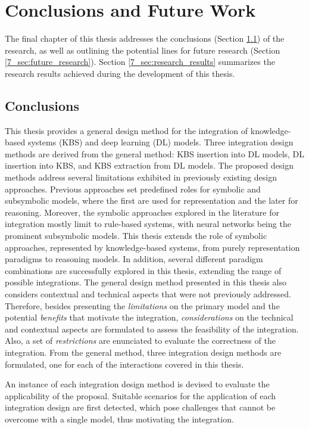 \chapter{Conclusions and Future Work}
\label{chap:conc}
The final chapter of this thesis addresses the conclusions (Section \ref{7_sec:conclusions}) of the research, as well as outlining the potential lines for future research (Section \ref{7_sec:future_research}). Section \ref{7_sec:research_results} summarizes the research results achieved during the development of this thesis.

\section{Conclusions}\label{7_sec:conclusions}
This thesis provides a general design method for the integration of knowledge-based systems (KBS) and deep learning (DL) models. Three integration design methods are derived from the general method: KBS insertion into DL models, DL insertion into KBS, and KBS extraction from DL models. The proposed design methods address several limitations exhibited in previously existing design approaches. Previous approaches set predefined roles for symbolic and subsymbolic models, where the first are used for representation and the later for reasoning. Moreover, the symbolic approaches explored in the literature for integration mostly limit to rule-based systems, with neural networks being the prominent subsymbolic models. This thesis extends the role of symbolic approaches, represented by knowledge-based systems, from purely representation paradigms to reasoning models. In addition, several different paradigm combinations are successfully explored in this thesis, extending the range of possible integrations. The general design method presented in this thesis also considers contextual and technical aspects that were not previously addressed. Therefore, besides presenting the \textit{limitations} on the primary model and the potential \textit{benefits} that motivate the integration, \textit{considerations} on the technical and contextual aspects are formulated to assess the feasibility of the integration. Also, a set of \textit{restrictions} are enunciated to evaluate the correctness of the integration. From the general method, three integration design methods are formulated, one for each of the interactions covered in this thesis. 


An instance of each integration design method is devised to evaluate the applicability of the proposal. Suitable scenarios for the application of each integration design are first detected, which pose challenges that cannot be overcome with a single model, thus motivating the integration. 

